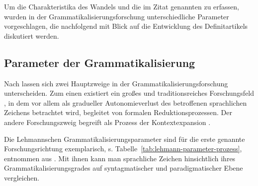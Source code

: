 \noindent 
Um die Charakteristika des Wandels und die im Zitat genannten  zu erfassen, wurden in der Grammatikalisierungsforschung unterschiedliche Parameter  vorgeschlagen, die nachfolgend mit Blick auf die Entwicklung des Definitartikels diskutiert werden.   


\subsection{Parameter der Grammatikalisierung}\label{sec:parameter}

Nach \textcite[96--112]{Traugott2013} lassen sich zwei Hauptzweige in der Grammatikalisierungsforschung unterscheiden. Zum einen existiert ein großes und traditionsreiches Forschungsfeld \parencite[hierzu zählen u.a. die Arbeiten von][]{Givon1979,Haspelmath2004,Lehmann2015,}, in dem  vor allem als gradueller Autonomieverlust des betroffenen sprachlichen Zeichens betrachtet wird, begleitet von formalen Reduktionsprozessen. Der andere Forschungszweig begreift  als Prozess der Kontextexpansion  \parencite{Himmelmann1997,Himmelmann2004}. 

Die Lehmannschen Grammatikalisierungsparameter  sind für die erste genannte  Forschungsrichtung exemplarisch, s. Tabelle~\ref{tab:lehmann-parameter-prozess}, entnommen aus \textcite{Lehmann1995}. Mit ihnen kann man sprachliche Zeichen hinsichtlich ihres Grammatikalisierungsgrades auf syntagmatischer und paradigmatischer Ebene vergleichen. 

